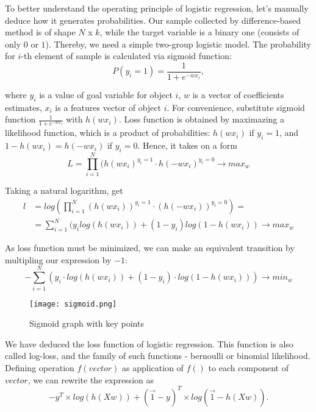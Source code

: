 \documentclass[a4paper, 12pt]{extreport}
\begin{document}
To better understand the operating principle of logistic regression, let's manually deduce how it generates probabilities. Our sample collected by difference-based method is of shape $N$ x $k$, while
the target variable is a binary one (consists of only $0$ or $1$). Thereby, we need a simple two-group logistic model. The probability for $i$-th element of sample is calculated via sigmoid function:
\begin{equation}
	P(y_i = 1) = \frac{1}{1 + e^{-wx_i}},
\end{equation}

where $y_i$ is a value of goal variable for object $i$, $w$ is a vector of coefficients estimates, $x_i$ is a features vector of object $i$. For convenience, substitute sigmoid function $\frac{1}{1 + e^{-wx_i}}$
with $h(wx_i)$. Loss function is obtained by maximazing a likelihood function, which is a product of probabilities: $h(wx_i)$ if $y_i = 1$, and $1 - h(wx_i) = h(-wx_i)$ if $y_i = 0$. Hence, it takes on a form
\begin{equation}
	L = \prod_{i=1}^N (h(wx_i)^{y_i = 1} \cdot h(-wx_i)^{y_i = 0} \rightarrow max_{w}
\end{equation}

Taking a natural logarithm, get
\begin{align}
	l &= log (\prod_{i=1}^N (h(wx_i))^{y_i = 1} \cdot (h(-wx_i))^{y_i = 0}) = \nonumber \\
	&= \sum_{i=1}^N (y_i log(h(wx_i)) + (1 - y_i) log(1 - h(wx_i)) \rightarrow max_w
\end{align}

As loss function must be minimized, we can make an equivalent transition by multipling our expression by $-1$:
\begin{equation}
	- \sum_{i=1}^N (y_i \cdot log(h(wx_i)) + (1 - y_i) \cdot log(1 - h(wx_i))) \rightarrow min_w
\end{equation}

\begin{figure}
  \texttt{[image: sigmoid.png]}
  \caption{Sigmoid graph with key points}
\end{figure}

We have deduced the loss function of logistic regression. This function is also called log-loss, and the family of such functions - bernoulli or binomial likelihood. Defining operation $f(vector)$ as application of $f()$ to each component of $vector$, we can rewrite
the expression as
\begin{equation}
	- y^T \times log(h(Xw)) + (\vec 1 - y)^T \times log(\vec 1 - h(Xw)).
\end{equation}
\end{document}

